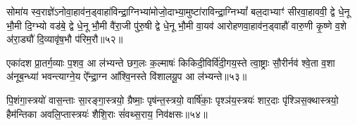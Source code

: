 सोमा॑य स्व॒राज्ञे॑\-ऽनोवा॒हाव॑न॒ड्वाहा॑विन्द्रा॒ग्निभ्या॑मोजो॒दाभ्या॒मुष्टा॑राविन्द्रा॒ग्नि\-भ्यां᳚ बल॒दाभ्याꣳ॑ सीरवा॒हाववी॒ द्वे धे॒नू भौ॒मी दि॒ग्भ्यो वड॑बे॒ द्वे धे॒नू भौ॒मी वै॑रा॒जी पु॑रु॒षी द्वे धे॒नू भौ॒मी वा॒यव॑ आरोहणवा॒हाव॑न॒ड्वाहौ॑ वारु॒णी कृ॒ष्णे व॒शे अ॑रा॒ड्यौ॑ दि॒व्यावृ॑ष॒भौ प॑रिम॒रौ॥५२॥

{\anuvakamend[{सोमा॑य स्व॒राज्ञे॒ चतु॑स्त्रिꣳशत्॥21॥}]}

एका॑दश प्रा॒तर्ग॒व्याः प॒शव॒ आ ल॑भ्यन्ते छग॒लः क॒ल्माषः॑ किकिदी॒विर्वि॑दी॒गय॒स्ते त्वा॒ष्ट्राः सौ॒रीर्नव॑ श्वे॒ता व॒शा अ॑नूब॒न्ध्या॑ भवन्त्याग्ने॒य ऐ᳚न्द्रा॒ग्न आ᳚श्वि॒नस्ते वि॑शालयू॒प आ ल॑भ्यन्ते॥५३॥

{\anuvakamend[{एका॑दश॒ पञ्च॑विꣳशतिः॥22॥}]}

पि॒शंगा॒स्त्रयो॑ वास॒न्ताः सा॒रङ्गा॒स्त्रयो॒ ग्रैष्माः॒ पृष॑न्त॒स्त्रयो॒ वार्\mbox{}षि॑काः॒ पृश्ञ॑य॒स्त्रयः॑ शार॒दाः पृ॑श्ञिस॒क्थास्त्रयो॒ हैम॑न्तिका अवलि॒प्तास्त्रयः॑ शैशि॒राः सं॑वथ्स॒राय॒ निव॑क्षसः॥५४॥


{\anuvakamend[{पि॒शङ्गा॑ विꣳश॒तिः॥23॥}]}

{}
